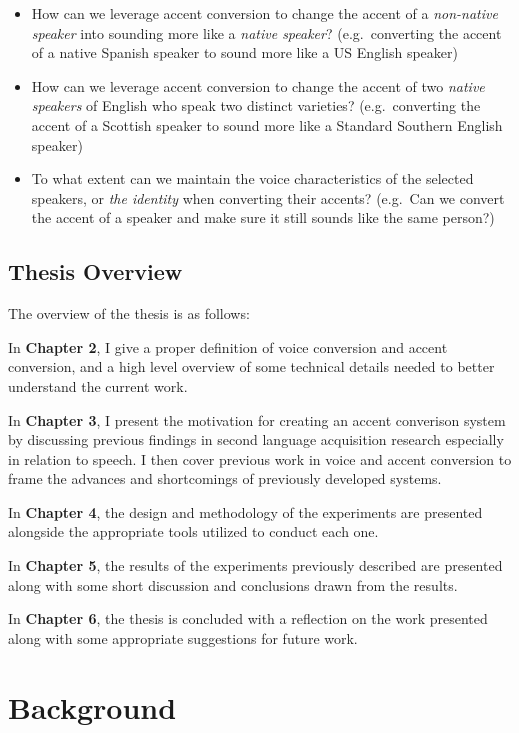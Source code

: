 \documentclass
[
    a4paper,
    twoside,
    12pt,
]
{report}
\begin{document}
\begin{itemize}
\item
  How can we leverage accent conversion to change the accent of a
  \emph{non-native speaker} into sounding more like a \emph{native
  speaker}? (e.g.~converting the accent of a native Spanish speaker to
  sound more like a US English speaker)
\item
  How can we leverage accent conversion to change the accent of two
  \emph{native speakers} of English who speak two distinct varieties?
  (e.g.~converting the accent of a Scottish speaker to sound more like a
  Standard Southern English speaker)
\item
  To what extent can we maintain the voice characteristics of the
  selected speakers, or \emph{the identity} when converting their
  accents? (e.g.~Can we convert the accent of a speaker and make sure it
  still sounds like the same person?)
\end{itemize}

\hypertarget{thesis-overview}{%
\section{Thesis Overview}\label{thesis-overview}}

The overview of the thesis is as follows:

In \textbf{Chapter 2}, I give a proper definition of voice conversion
and accent conversion, and a high level overview of some technical
details needed to better understand the current work.

In \textbf{Chapter 3}, I present the motivation for creating an accent
converison system by discussing previous findings in second language
acquisition research especially in relation to speech. I then cover
previous work in voice and accent conversion to frame the advances and
shortcomings of previously developed systems.

In \textbf{Chapter 4}, the design and methodology of the experiments are
presented alongside the appropriate tools utilized to conduct each one.

In \textbf{Chapter 5}, the results of the experiments previously
described are presented along with some short discussion and conclusions
drawn from the results.

In \textbf{Chapter 6}, the thesis is concluded with a reflection on the
work presented along with some appropriate suggestions for future work.
\cleardoublepage

\chapter{Background}
\end{document}
